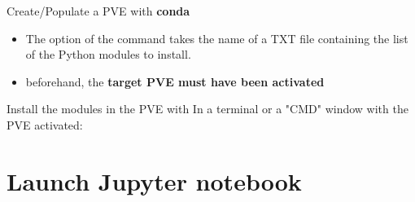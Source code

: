 \documentclass[10pt,serif,mathserif,compress,hyperref={colorlinks}]{beamer}
\begin{document}
\begin{frame}{Create/Populate a PVE with \textbf{conda}}

  \begin{tcolorbox}[title={\bf Populate a venv PVE}]  
    \begin{itemize}
    \item The  option of the  command takes the name of a TXT file
      containing the list of the Python modules to install.
    \item beforehand, the {\bf target PVE must have been activated}
    \end{itemize}
  \end{tcolorbox}

  \begin {bclogo}[noborder=true, couleur=gray!50, couleurBarre=Chocolate, logo=\bctrombone, marge=0, margeG=-.8]
    {Install the modules in the  PVE with }
    {\small In a terminal  or a "CMD" window \DarkGray{\footnotesize[Windows]}}
    with the  PVE activated:\\
    \hspace*{10pt}
  \end{bclogo}

  \vfill
  
\end{frame}

\section{Launch Jupyter notebook}
\end{document}
